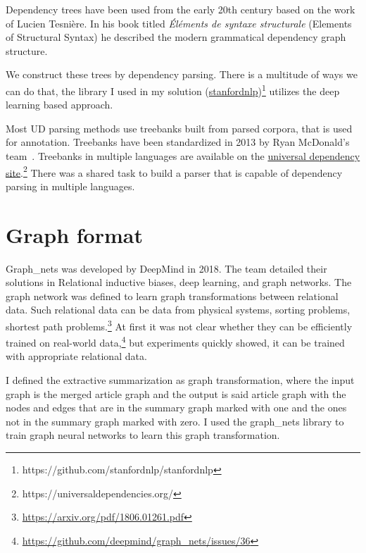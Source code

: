 Dependency trees have been used from the early 20th century based on the work of Lucien Tesni\`ere. In his book titled \textit{\'El\'ements de syntaxe structurale} (Elements of Structural Syntax)\cite{UD} he described the modern grammatical dependency graph structure.

We construct these trees by dependency parsing. There is a multitude of ways we can do that, the library I used in my solution (\href{https://github.com/stanfordnlp/stanfordnlp}{stanfordnlp})\footnote{https://github.com/stanfordnlp/stanfordnlp} utilizes the deep learning based approach.

Most UD parsing methods use treebanks built from parsed corpora, that is used for annotation. Treebanks have been standardized in 2013 by Ryan McDonald's team~\cite{TextRank}. Treebanks in multiple languages are available on the \href{https://universaldependencies.org/}{universal dependency site}.\footnote{https://universaldependencies.org/} There was a shared task\cite{ParserSharedTask} to build a parser that is capable of dependency parsing in multiple languages.

\section{Graph format}

Graph\_nets was developed by DeepMind in 2018. The team detailed their solutions in Relational inductive biases, deep learning, and graph networks\cite{GraphNet}. The graph network was defined to learn graph transformations between relational data. Such relational data can be data from physical systems, sorting problems, shortest path problems.\footnote{\url{https://arxiv.org/pdf/1806.01261.pdf}} At first it was not clear whether they can be efficiently trained on real-world data,\footnote{\url{https://github.com/deepmind/graph\_nets/issues/36}} but experiments quickly showed, it can be trained with appropriate relational data.

I defined the extractive summarization as graph transformation, where the input graph is the merged article graph and the output is said article graph with the nodes and edges that are in the summary graph marked with one and the ones not in the summary graph marked with zero. I used the graph\_nets library to train graph neural networks to learn this graph transformation.
	
